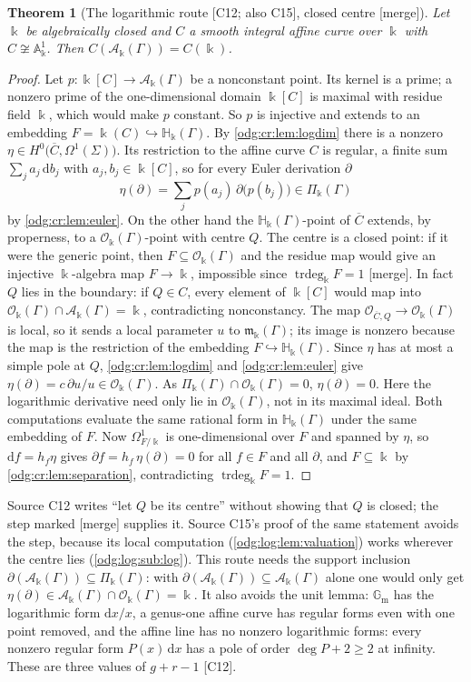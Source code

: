 \documentclass[11pt,oneside]{article}
\numberwithin{equation}{section}
\newtheorem{theorem}{Theorem}[section]
\theoremstyle{definition}
\theoremstyle{remark}
\newcommand{\src}[1]{\textup{\textsf{\small[#1]}}}
\newcommand{\mergetag}{\textup{\textsf{\small[merge]}}}
\newcommand{\crH}{\mathbb H_\Bbbk(\Gamma)}
\newcommand{\crA}{\mathcal A_\Bbbk(\Gamma)}
\newcommand{\crP}{\Pi_\Bbbk(\Gamma)}
\newcommand{\crO}{\mathcal O_\Bbbk(\Gamma)}
\newcommand{\crm}{\mathfrak m_\Bbbk(\Gamma)}
\newcommand{\Aff}{\mathbb A}
\newcommand{\Gm}{\mathbb G_{\mathrm m}}
\newcommand{\trdeg}{\operatorname{trdeg}}
\newcommand{\dif}{\mathrm d}
\begin{document}
\begin{theorem}[The logarithmic route \src{C12; also C15}, closed centre \mergetag]\label{odg:cr:thm:logroute}
Let $\Bbbk$ be algebraically closed and $C$ a smooth integral affine curve over
$\Bbbk$ with $C\not\cong\Aff^1_\Bbbk$. Then $C(\crA)=C(\Bbbk)$.
\end{theorem}
\begin{proof}
Let $p:\Bbbk[C]\to\crA$ be a nonconstant point. Its kernel is a prime; a nonzero
prime of the one-dimensional domain $\Bbbk[C]$ is maximal with residue field $\Bbbk$,
which would make $p$ constant. So $p$ is injective and extends to an embedding
$F=\Bbbk(C)\hookrightarrow\crH$. By \cref{odg:cr:lem:logdim} there is a nonzero
$\eta\in H^0\bigl(\overline C,\Omega^1(\Sigma)\bigr)$. Its restriction to the affine
curve $C$ is regular, a finite sum $\sum_ja_j\,\dif b_j$ with $a_j,b_j\in\Bbbk[C]$,
so for every Euler derivation $\partial$
\[
 \eta(\partial)=\sum_jp(a_j)\,\partial\bigl(p(b_j)\bigr)\in\crP
\]
by \cref{odg:cr:lem:euler}. On the other hand the $\crH$-point of $\overline C$
extends, by properness, to a $\crO$-point with centre $Q$. The centre is a closed
point: if it were the generic point, then $F\subseteq\crO$ and the residue map would
give an injective $\Bbbk$-algebra map $F\to\Bbbk$, impossible since
$\trdeg_\Bbbk F=1$ \mergetag. In fact $Q$ lies in the boundary: if $Q\in C$,
every element of $\Bbbk[C]$ would map into $\crO\cap\crA=\Bbbk$, contradicting
nonconstancy. The map $\mathcal O_{\overline C,Q}\to\crO$ is local, so it sends
a local parameter $u$ to $\crm$; its image is nonzero because the map is the
restriction of the embedding $F\hookrightarrow\crH$. Since $\eta$
has at most a simple pole at $Q$, \cref{odg:cr:lem:logdim} and
\cref{odg:cr:lem:euler} give $\eta(\partial)=c\,\partial u/u\in\crO$. As
$\crP\cap\crO=0$, $\eta(\partial)=0$. Here the logarithmic derivative need only
lie in $\crO$, not in its maximal ideal. Both computations evaluate the same
rational form in $\crH$ under the same embedding of $F$.
Now $\Omega^1_{F/\Bbbk}$ is one-dimensional over
$F$ and spanned by $\eta$, so $\dif f=h_f\eta$ gives $\partial f=h_f\,\eta(\partial)=0$
for all $f\in F$ and all $\partial$, and $F\subseteq\Bbbk$ by
\cref{odg:cr:lem:separation}, contradicting $\trdeg_\Bbbk F=1$.
\end{proof}

Source C12 writes ``let $Q$ be its centre'' without showing that $Q$ is closed;
the step marked \mergetag{} supplies it. Source C15's proof of the same statement
avoids the step, because its local computation (\cref{odg:log:lem:valuation}) works
wherever the centre lies (\cref{odg:log:sub:log}). This route needs the support inclusion
$\partial(\crA)\subseteq\crP$: with $\partial(\crA)\subseteq\crA$ alone one would only get
$\eta(\partial)\in\crA\cap\crO=\Bbbk$. It also avoids the unit lemma: $\Gm$ has the
logarithmic form $\dif x/x$, a genus-one affine curve has regular forms even with
one point removed, and the affine line has no nonzero logarithmic forms:
every nonzero regular form $P(x)\,\dif x$ has a pole of order $\deg P+2\ge2$
at infinity. These are three values of $g+r-1$ \src{C12}.
\end{document}
